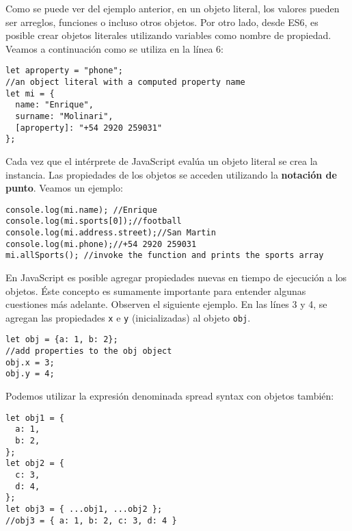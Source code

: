 \documentclass[a4paper, oneside, titlepage, 12pt]{paper}
\begin{document}
Como se puede ver del ejemplo anterior, en un objeto literal, los valores pueden ser arreglos, funciones o incluso otros objetos. Por otro lado, desde ES6, es posible crear objetos literales utilizando variables como nombre de propiedad. Veamos a continuación como se utiliza en la línea 6: 

\begin{verbatim}
let aproperty = "phone";               
//an object literal with a computed property name 
let mi = {
  name: "Enrique",
  surname: "Molinari",
  [aproperty]: "+54 2920 259031"
};

\end{verbatim}

Cada vez que el intérprete de JavaScript evalúa un objeto literal se crea la instancia. Las propiedades de los objetos se acceden utilizando la \textbf{notación de punto}. Veamos un ejemplo:

\begin{verbatim}
console.log(mi.name); //Enrique
console.log(mi.sports[0]);//football
console.log(mi.address.street);//San Martin
console.log(mi.phone);//+54 2920 259031
mi.allSports(); //invoke the function and prints the sports array               
\end{verbatim}

En JavaScript es posible agregar propiedades nuevas en tiempo de ejecución a los objetos. Éste concepto es sumamente importante para entender algunas cuestiones más adelante. Observen el siguiente ejemplo. En las línes 3 y 4, se agregan las propiedades \texttt{x} e \texttt{y} (inicializadas) al objeto \texttt{obj}.

\begin{verbatim}
let obj = {a: 1, b: 2};
//add properties to the obj object
obj.x = 3;
obj.y = 4;
\end{verbatim}

Podemos utilizar la expresión denominada spread syntax con objetos también:

\begin{verbatim}
let obj1 = {
  a: 1,
  b: 2,
};
let obj2 = {
  c: 3,
  d: 4,
};
let obj3 = { ...obj1, ...obj2 };
//obj3 = { a: 1, b: 2, c: 3, d: 4 }
\end{verbatim}
\end{document}
